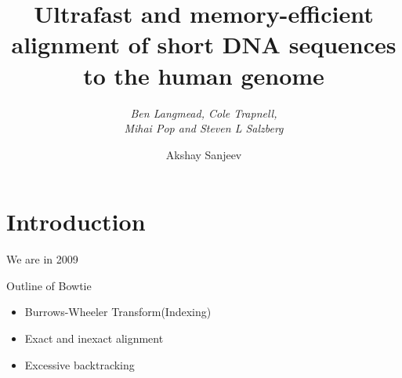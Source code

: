 \documentclass[mathserif]{beamer}
\title{Ultrafast and memory-efficient alignment of short DNA sequences
to the human genome}
\subtitle{\textit{Ben Langmead, Cole Trapnell, \\Mihai Pop and Steven L Salzberg}}
\author{Akshay Sanjeev}
\begin{document}
\begin{frame}
    \maketitle
\end{frame}

\section{Introduction}
\begin{frame}{We are in 2009}

\end{frame}

\begin{frame}{Outline of Bowtie}
    \begin{itemize}
        \item Burrows-Wheeler Transform(Indexing)
        \item Exact and inexact alignment
        \item Excessive backtracking
    \end{itemize}
\end{frame}
\end{document}
